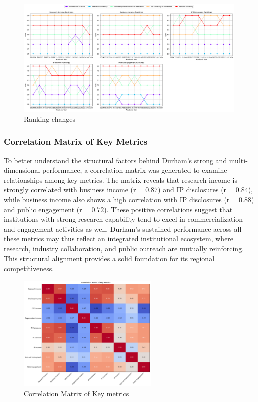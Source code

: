 \documentclass[journal,onecolumn, 10pt,draftclsnofoot]{IEEEtran}
\begin{document}
\begin{figure}[h]
\centering
\includegraphics[width=0.99\textwidth]{Fig/figure35.ranking_changes.png}
\caption{Ranking changes}
\label{fig:ranking-changes}
\end{figure}

\subsubsection{Correlation Matrix of Key Metrics}

To better understand the structural factors behind Durham's strong and multi-dimensional performance, a correlation matrix \cite{pearson1895notes,fisher1915frequency} was generated to examine relationships among key metrics. The matrix reveals that research income is strongly correlated with business income ($\mathrm{r}=0.87$) and IP disclosures ($\mathrm{r}=0.84$), while business income also shows a high correlation with IP disclosures ($\mathrm{r}=0.88$) and public engagement ($\mathrm{r}=0.72$). These positive correlations suggest that institutions with strong research capability tend to excel in commercialization and engagement activities as well. Durham's sustained performance across all these metrics may thus reflect an integrated institutional ecosystem, where research, industry collaboration, and public outreach are mutually reinforcing. This structural alignment provides a solid foundation for its regional competitiveness.



\begin{figure}[h]
\centering
\includegraphics[width=0.6\textwidth]{Fig/figure36.correlation_matrix.png}
\caption{Correlation Matrix of Key metrics}
\label{fig:correlation-matrix}
\end{figure}
\end{document}
